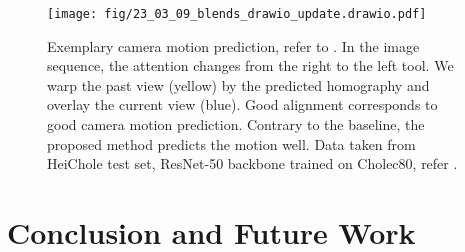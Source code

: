 \begin{figure}[htb]
\centering
\texttt{[image: fig/23\_03\_09\_blends\_drawio\_update.drawio.pdf]}
\caption{Exemplary camera motion prediction, refer to . In the image sequence, the attention changes from the right to the left tool. We warp the past view (yellow) by the predicted homography and overlay the current view (blue). Good alignment corresponds to good camera motion prediction. Contrary to the baseline, the proposed method predicts the motion well. Data taken from HeiChole test set, ResNet-50 backbone trained on Cholec80, refer .}
\label{c4:fig:predicted_camera_motion_sequence}
\end{figure}





\section{Conclusion and Future Work}
